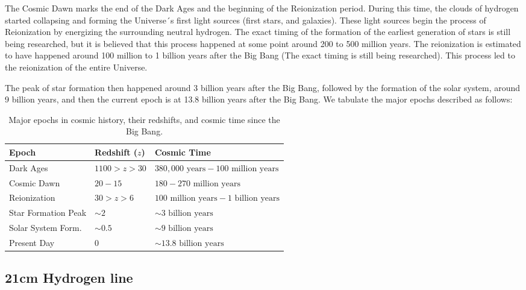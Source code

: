 \documentclass[apj]{emulateapj}
\begin{document}
The Cosmic Dawn marks the end of the Dark Ages and the beginning of the Reionization period. During this time, the clouds of hydrogen started collapsing and forming the Universe´s first light sources (first stars, and galaxies). These light sources begin the process of Reionization by energizing the surrounding neutral hydrogen. The exact timing of the formation of the earliest generation of stars is still being researched, but it is believed that this process happened at some point around 200 to 500 million years. The reionization is estimated to have happened around 100 million to 1 billion years after the Big Bang (The exact timing is still being researched). This process led to the reionization of the entire Universe. 

The peak of star formation then happened around 3 billion years after the Big Bang, followed by the formation of the solar system, around 9 billion years, and then the current epoch is at 13.8 billion years after the Big Bang. We tabulate the major epochs described as follows:

\begin{table}[H]
\centering
\begin{tabular}{|>{\raggedright\arraybackslash}m{2.8cm}|>{\centering\arraybackslash}m{2.5cm}|>{\centering\arraybackslash}m{2.8cm}|}
\hline
\textbf{Epoch} & \textbf{Redshift (\(z\))} & \textbf{Cosmic Time} \\
\hline
Dark Ages & \( 1100 > z > 30 \) & \( 380{,}000 \text{ years} - 100 \text{ million years} \) \\
\hline
Cosmic Dawn & \( 20 - 15 \) & \( 180 - 270 \text{ million years} \) \\
\hline
Reionization & \( 30 > z > 6 \) & \( 100 \text{ million years} - 1 \text{ billion years} \) \\
\hline
Star Formation Peak & \( \sim 2 \) & \( \sim 3 \text{ billion years} \) \\
\hline
Solar System Form. & \( \sim 0.5 \) & \( \sim 9 \text{ billion years} \) \\
\hline
Present Day & \( 0 \) & \( \sim 13.8 \text{ billion years} \) \\
\hline
\end{tabular}
\caption{Major epochs in cosmic history, their redshifts, and cosmic time since the Big Bang.}
\label{table:cosmic_history}
\end{table}


\subsection{21cm Hydrogen line}
\end{document}
